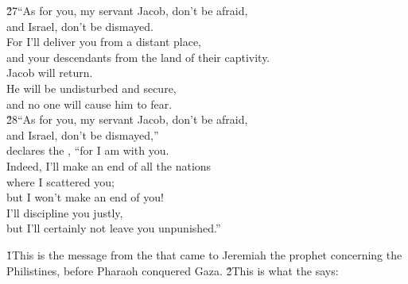 \begin{poetry}
\poeml \v{27}``As for you, my servant Jacob, don't be afraid, \\
\poemll    and Israel, don't be dismayed. \\
\poeml For I'll deliver you from a distant place, \\
\poemll    and your descendants from the land of their captivity. \\
\poeml Jacob will return. \\
\poemll    He will be undisturbed and secure, \\
\poemlll       and no one will cause him to fear. \\
\poeml \v{28}``As for you, my servant Jacob, don't be afraid, \\
\poemll    and Israel, don't be dismayed,'' \\
\poemlll       declares the , ``for I am with you. \\
\poeml Indeed, I'll make an end of all the nations \\
\poemll    where I scattered you; \\
\poemll    but I won't make an end of you! \\
\poeml I'll discipline you justly, \\
\poemll    but I'll certainly not leave you unpunished.''
\end{poetry}

\v{1}This is the message from the  that came to Jeremiah the prophet concerning the Philistines, before Pharaoh conquered Gaza. \v{2}This is what the  says:


